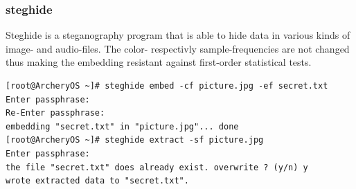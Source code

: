 \documentclass{article}
\begin{document}
\subsubsection{steghide}
Steghide  is  a steganography program that is able to hide data in various kinds of image- and audio-files. The color- respectivly sample-frequencies are  not  changed  thus making the embedding resistant against first-order statistical tests.
\begin{lstlisting}
[root@ArcheryOS ~]# steghide embed -cf picture.jpg -ef secret.txt
Enter passphrase: 
Re-Enter passphrase: 
embedding "secret.txt" in "picture.jpg"... done
[root@ArcheryOS ~]# steghide extract -sf picture.jpg
Enter passphrase:
the file "secret.txt" does already exist. overwrite ? (y/n) y
wrote extracted data to "secret.txt".
\end{lstlisting}
\end{document}

